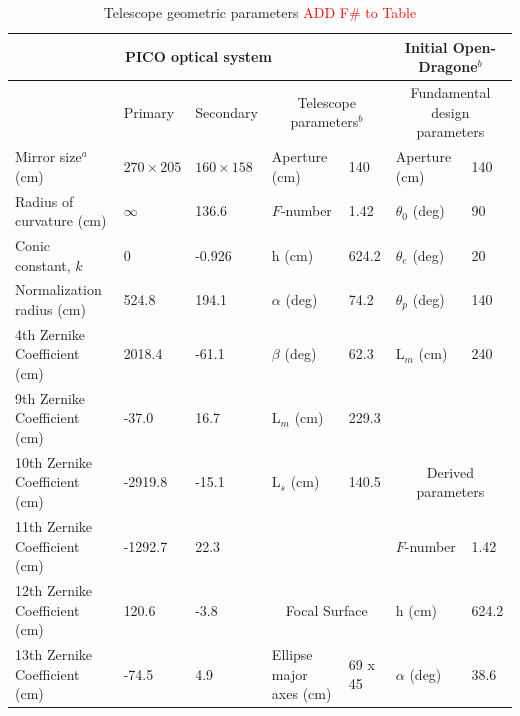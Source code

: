 \documentclass[]{spie}  %
\newcommand{\comr}[1]{\textcolor{red}{#1}}
\begin{document}
\begin{table}[ht]
\centering
\caption{Telescope geometric parameters  \comr{ADD F\# to Table} \label{tab:optics}}

\begin{adjustbox}{width=1.05\textwidth}
\hspace{-1cm}
\begin{tabular}{|l|llll||ll|}
\hline
\multicolumn{5}{|c||}{PICO optical system}                                    & \multicolumn{2}{c|}{Initial Open-Dragone$^b$}     \\ \hline
                          & Primary           & Secondary    & \multicolumn{2}{c||}{Telescope parameters$^b$} & \multicolumn{2}{c|}{Fundamental design parameters}  \\
Mirror size$^a$ (cm)      & $270 \times 205$ & $160 \times 158$ & Aperture (cm)           & 140      & Aperture (cm)                  & 140   \\
Radius of curvature (cm)  & $\infty$         & 136.6             & $F$-number             & 1.42     & $\theta_0$ (deg)           & 90    \\
Conic constant, $k$       & 0                 & -0.926            & h (cm)                    & 624.2    & $\theta_e$ (deg)           & 20    \\
Normalization radius (cm) & 524.8             & 194.1             & $\alpha$ (deg)            & 74.2     & $\theta_p$ (deg)           & 140   \\
4th Zernike Coefficient (cm)  & 2018.4            & -61.1             & $\beta$  (deg)            &  62.3    & L$_m$ (cm)                     & 240   \\
9th Zernike Coefficient (cm)  & -37.0             & 16.7              & L$_m$ (cm)                &   229.3  &                                &         \\
10th Zernike Coefficient (cm) & -2919.8           & -15.1             & L$_s$ (cm)                &   140.5  & \multicolumn{2}{c|}{Derived parameters} \\ 
11th Zernike Coefficient (cm) & -1292.7           & 22.3              &                           &          & $F$-number                     & 1.42  \\   
12th Zernike Coefficient (cm) & 120.6             & -3.8             &   \multicolumn{2}{c||}{Focal Surface}  & h (cm)                         & 624.2 \\   
13th Zernike Coefficient (cm) & -74.5             & 4.9               & Ellipse major axes (cm)   & 69 x 45  & $\alpha$ (deg)                 & 38.6  \\   

\end{tabular}
\end{adjustbox}
\end{table}
\end{document}
